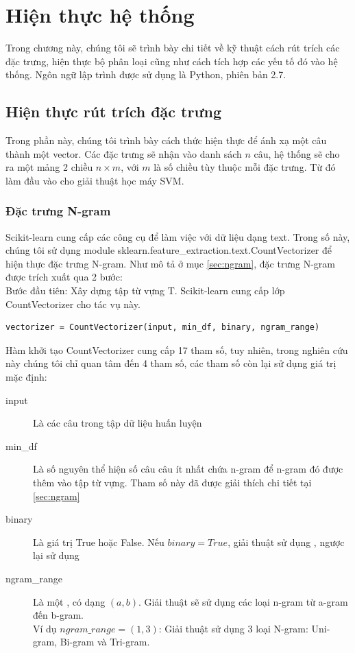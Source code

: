\section{Hiện thực hệ thống} \label{sec:hienthuchethong}
Trong chương này, chúng tôi sẽ trình bày chi tiết về kỹ thuật cách rút trích các đặc trưng, hiện thực bộ phân loại cũng như cách tích hợp các yếu tố đó vào hệ thống. Ngôn ngữ lập trình được sử dụng là Python, phiên bản 2.7.

\subsection{Hiện thực rút trích đặc trưng}
Trong phần này, chúng tôi trình bày cách thức hiện thực để ánh xạ một câu thành một vector. Các đặc trưng sẽ nhận vào danh sách $n$ câu, hệ thống sẽ cho ra một mảng 2 chiều $n \times m$, với $m$ là số chiều tùy thuộc mỗi đặc trưng. Từ đó làm đầu vào cho giải thuật học máy SVM.
\subsubsection*{Đặc trưng N-gram}
Scikit-learn cung cấp các công cụ để làm việc với dữ liệu dạng text. Trong số này, chúng tôi sử dụng module sklearn.feature\_extraction.text.CountVectorizer để hiện thực đặc trưng N-gram. Như mô tả ở mục \ref{sec:ngram}, đặc trưng N-gram được trích xuất qua 2 bước:\\

Bước đầu tiên: Xây dựng tập từ vựng T. Scikit-learn cung cấp lớp CountVectorizer cho tác vụ này.
\begin{lstlisting}
vectorizer = CountVectorizer(input, min_df, binary, ngram_range)
\end{lstlisting}
Hàm khởi tạo CountVectorizer cung cấp 17 tham số, tuy nhiên, trong nghiên cứu này chúng tôi chỉ quan tâm đến 4 tham số, các tham số còn lại sử dụng giá trị mặc định:
\begin{description}
\item[input] Là các câu trong tập dữ liệu huấn luyện
\item[min\_df] Là số nguyên thể hiện số câu câu ít nhất chứa n-gram để n-gram đó được thêm vào tập từ vựng. Tham số này đã được giải thích chi tiết tại \ref{sec:ngram}
\item[binary] Là giá trị True hoặc False. Nếu $binary=True$, giải thuật sử dụng \footnotemark, 
ngược lại sử dụng \footnotemark
 \item[ngram\_range] Là một , có dạng $(a, b)$. Giải thuật sẽ sử dụng các loại n-gram từ a-gram đến b-gram. \\
 Ví dụ $ngram\_range = (1,3)$: Giải thuật sử dụng 3 loại N-gram: Uni-gram, Bi-gram và Tri-gram.
\end{description}

